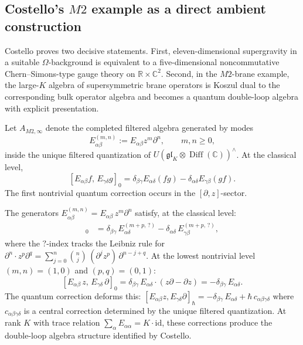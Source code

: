 \subsection{Costello's \texorpdfstring{$M2$}{M2} example as a direct ambient construction}
\label{subsec:m2-ambient-construction}

Costello proves two decisive statements. First, eleven-dimensional
supergravity in a suitable $\Omega$-background is equivalent to a
five-dimensional noncommutative Chern--Simons-type gauge theory on
$\mathbb{R} \times \mathbb{C}^2$. Second, in the $M2$-brane
example, the large-$K$ algebra of supersymmetric brane operators is
Koszul dual to the corresponding bulk operator algebra and becomes
a quantum double-loop algebra with explicit presentation.

\begin{definition}
\label{def:m2-boundary-algebra}
Let $A_{M2,\infty}$ denote the completed filtered algebra generated
by modes
\[
E^{(m,n)}_{\alpha\beta} := E_{\alpha\beta} z^m \partial^n,
\qquad m, n \geq 0,
\]
inside the unique filtered quantization of
$U(\mathfrak{gl}_K \otimes \operatorname{Diff}(\mathbb{C}))^{\wedge}$.
At the classical level,
\[
[E_{\alpha\beta}f,\, E_{\gamma\delta}g]_0
=
\delta_{\beta\gamma}E_{\alpha\delta}(fg)
- \delta_{\alpha\delta}E_{\gamma\beta}(gf).
\]
The first nontrivial quantum correction occurs in the
$[\partial, z]$-sector.
\end{definition}

\begin{example}
\label{ex:m2-commutation-explicit}
The generators $E^{(m,n)}_{\alpha\beta} = E_{\alpha\beta}\,z^m
\partial^n$ satisfy, at the classical level:
\begin{align}
[E^{(m,n)}_{\alpha\beta},\, E^{(p,q)}_{\gamma\delta}]_0
&= \delta_{\beta\gamma}\,E^{(m{+}p,\,?)}_{\alpha\delta}
- \delta_{\alpha\delta}\,E^{(m{+}p,\,?)}_{\gamma\beta},
\end{align}
where the $?$-index tracks the Leibniz rule for $\partial^n \cdot
z^p\partial^q = \sum_{j=0}^n \binom{n}{j}\,
(\partial^j z^p)\,\partial^{n-j+q}$. At the lowest nontrivial
level $(m,n) = (1,0)$ and $(p,q) = (0,1)$:
\[
[E_{\alpha\beta}\,z,\, E_{\gamma\delta}\,\partial]_0
= \delta_{\beta\gamma}\,E_{\alpha\delta}
\cdot (z\partial - \partial z)
= -\delta_{\beta\gamma}\,E_{\alpha\delta}.
\]
The quantum correction deforms this: $[E_{\alpha\beta}z,
E_{\gamma\delta}\partial]_\hbar
= -\delta_{\beta\gamma}\,E_{\alpha\delta}
+ \hbar\,c_{\alpha\beta\gamma\delta}$ where
$c_{\alpha\beta\gamma\delta}$ is a central correction determined
by the unique filtered quantization. At rank $K$ with trace
relation $\sum_\alpha E_{\alpha\alpha} = K\cdot\mathrm{id}$, these
corrections produce the double-loop algebra structure identified
by Costello.
\end{example}

